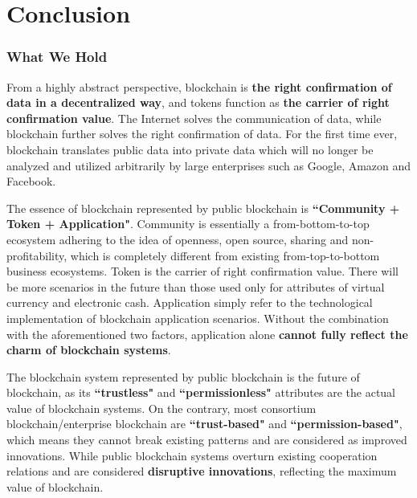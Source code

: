 \section{Conclusion}
\label{sec:conclusion}

\subsubsection*{What We Hold}

From a highly abstract perspective, blockchain is \textbf{the right confirmation of data in a decentralized way}, and tokens function as \textbf{the carrier of right confirmation value}. The Internet solves the communication of data, while blockchain further solves the right confirmation of data. For the first time ever, blockchain translates public data into private data which will no longer be analyzed and utilized arbitrarily by large enterprises such as Google, Amazon and Facebook.


The essence of blockchain represented by public blockchain is \textbf{``Community + Token + Application"}. Community is essentially a from-bottom-to-top ecosystem adhering to the idea of openness, open source, sharing and non-profitability, which is completely different from existing from-top-to-bottom business ecosystems. Token is the carrier of right confirmation value. There will be more scenarios in the future than those used only for attributes of virtual currency and electronic cash. Application simply refer to the technological implementation of blockchain application scenarios. Without the combination with the aforementioned two factors, application alone \textbf{cannot fully reflect the charm of blockchain systems}.


The blockchain system represented by public blockchain is the future of blockchain, as its \textbf{``trustless"} and \textbf{``permissionless"} attributes are the actual value of blockchain systems. On the contrary, most consortium blockchain/enterprise blockchain are \textbf{``trust-based"} and \textbf{``permission-based"}, which means they cannot break existing patterns and are considered as improved innovations. While public blockchain systems overturn existing cooperation relations and are considered \textbf{disruptive innovations}, reflecting the maximum value of blockchain.

